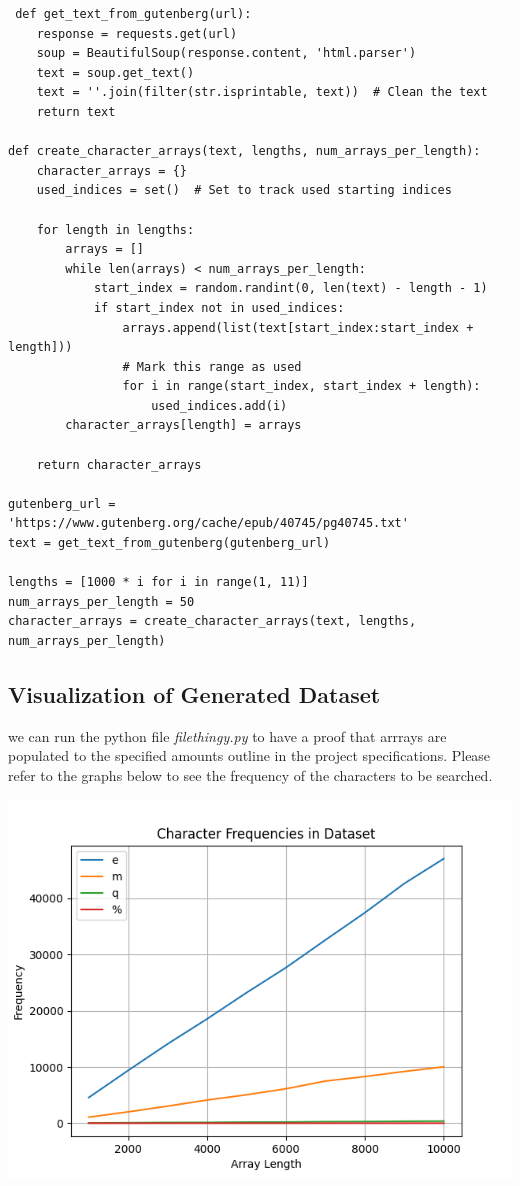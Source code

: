\documentclass{article}
\begin{document}
\begin{verbatim}
 def get_text_from_gutenberg(url):
    response = requests.get(url)
    soup = BeautifulSoup(response.content, 'html.parser')
    text = soup.get_text()
    text = ''.join(filter(str.isprintable, text))  # Clean the text
    return text

def create_character_arrays(text, lengths, num_arrays_per_length):
    character_arrays = {}
    used_indices = set()  # Set to track used starting indices

    for length in lengths:
        arrays = []
        while len(arrays) < num_arrays_per_length:
            start_index = random.randint(0, len(text) - length - 1)
            if start_index not in used_indices:
                arrays.append(list(text[start_index:start_index + length]))
                # Mark this range as used
                for i in range(start_index, start_index + length):
                    used_indices.add(i)
        character_arrays[length] = arrays

    return character_arrays

gutenberg_url = 'https://www.gutenberg.org/cache/epub/40745/pg40745.txt' 
text = get_text_from_gutenberg(gutenberg_url)
    
lengths = [1000 * i for i in range(1, 11)]  
num_arrays_per_length = 50
character_arrays = create_character_arrays(text, lengths, num_arrays_per_length)
\end{verbatim}
\subsection*{Visualization of Generated Dataset}
we can run the python file \emph{filethingy.py} to have a proof that arrrays are populated to the specified amounts outline in the project specifications. 
Please refer to the graphs below to see the frequency of the characters to be searched.

\includegraphics[width='13cm']{character_frequencies_in_dataset.png}
\end{document}
